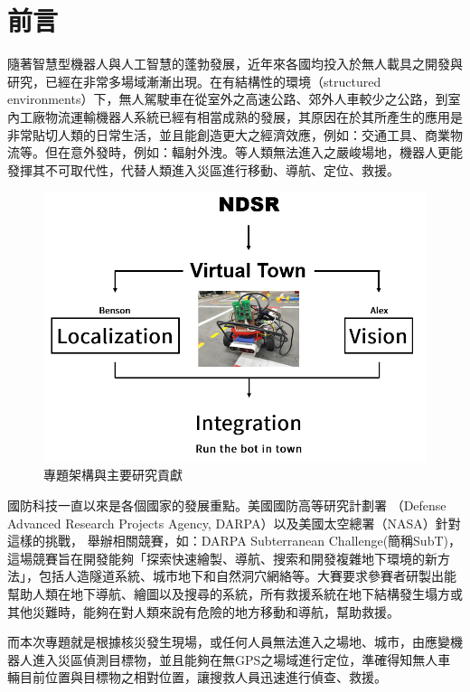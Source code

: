 \section{前言}

隨著智慧型機器人與人工智慧的蓬勃發展，近年來各國均投入於無人載具之開發與研究，已經在非常多場域漸漸出現。在有結構性的環境（structured environments）下，無人駕駛車在從室外之高速公路、郊外人車較少之公路，到室內工廠物流運輸機器人系統已經有相當成熟的發展，其原因在於其所產生的應用是非常貼切人類的日常生活，並且能創造更大之經濟效應，例如：交通工具、商業物流等。但在意外發時，例如：輻射外洩。等人類無法進入之嚴峻場地，機器人更能發揮其不可取代性，代替人類進入災區進行移動、導航、定位、救援。

\begin{figure}[t]
  \centering
    \includegraphics[width=\columnwidth]{images/teaser.png}
        \caption{專題架構與主要研究貢獻}
 \label{figure:teaser}
\end{figure}

國防科技一直以來是各個國家的發展重點。美國國防高等研究計劃署 （Defense Advanced Research Projects Agency, DARPA）以及美國太空總署（NASA）針對這樣的挑戰， 舉辦相關競賽，如：DARPA Subterranean Challenge(簡稱SubT)，這場競賽旨在開發能夠「探索快速繪製、導航、搜索和開發複雜地下環境的新方法」，包括人造隧道系統、城市地下和自然洞穴網絡等。大賽要求參賽者研製出能幫助人類在地下導航、繪圖以及搜尋的系統，所有救援系統在地下結構發生塌方或其他災難時，能夠在對人類來說有危險的地方移動和導航，幫助救援。

而本次專題就是根據核災發生現場，或任何人員無法進入之場地、城市，由應變機器人進入災區偵測目標物，並且能夠在無GPS之場域進行定位，準確得知無人車輛目前位置與目標物之相對位置，讓搜救人員迅速進行偵查、救援。

